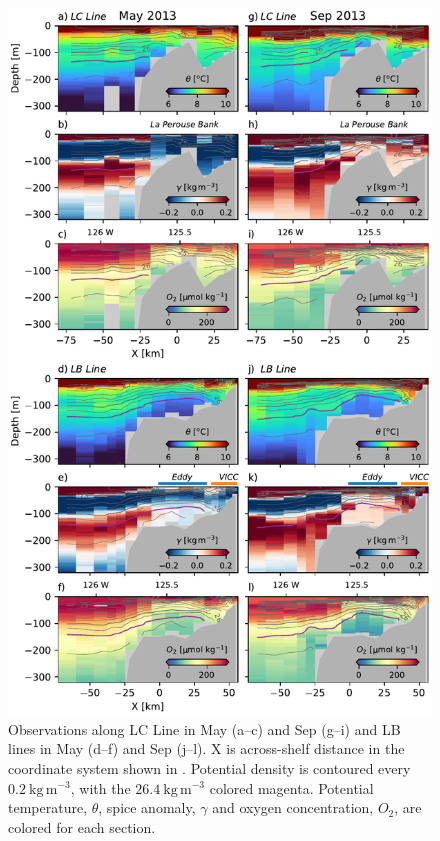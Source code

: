 \documentclass[draft]{agujournal2019}
\begin{document}
\begin{figure}[htbp]
  \begin{center}
     \includegraphics[width=130mm]{LaPerouse2013Ctd}
     \caption{Observations along LC Line in May (a--c) and Sep (g--i) and LB lines in May (d--f) and Sep (j--l).  X is across-shelf distance in the coordinate system shown in . Potential density is contoured every $0.2\ \mathrm{kg\,m^{-3}}$, with the $26.4\ \mathrm{kg\,m^{-3}}$ colored magenta.  Potential temperature, $\theta$, spice anomaly, $\gamma$ and oxygen concentration, $O_2$, are colored for each section.}
     \label{fig:LaPerouse2013Ctd}
  \end{center}
\end{figure}
\end{document}
